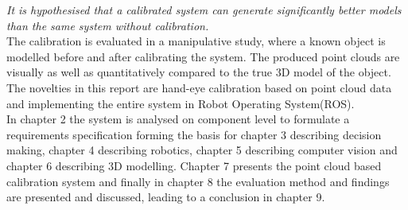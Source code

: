 \textit{It is hypothesised that a calibrated system can generate significantly better models than the same system without calibration.} \\

The calibration is evaluated in a manipulative study, where a known object is modelled before and after calibrating the system. The produced point clouds are visually as well as quantitatively compared to the true 3D model of the object. The novelties in this report are hand-eye calibration based on point cloud data and implementing the entire system in Robot Operating System(ROS).\\

In chapter 2 the system is analysed on component level to formulate a requirements specification forming the basis for chapter 3 describing decision making, chapter 4 describing robotics, chapter 5 describing computer vision and chapter 6 describing 3D modelling. Chapter 7 presents the point cloud based calibration system and finally in chapter 8 the evaluation method and findings are presented and discussed, leading to a conclusion in chapter 9.